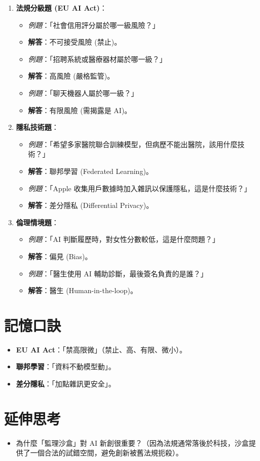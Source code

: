 \documentclass[
  letterpaper,
  DIV=11,
  numbers=noendperiod]{scrreprt}
\providecommand{\tightlist}{%
  \setlength{\itemsep}{0pt}\setlength{\parskip}{0pt}}
\begin{document}
\begin{enumerate}
\def\labelenumi{\arabic{enumi}.}
\tightlist
\item
  \textbf{法規分級題 (EU AI Act)}：

  \begin{itemize}
  \tightlist
  \item
    \emph{例題}：「社會信用評分屬於哪一級風險？」
  \item
    \textbf{解答}：不可接受風險 (禁止)。
  \item
    \emph{例題}：「招聘系統或醫療器材屬於哪一級？」
  \item
    \textbf{解答}：高風險 (嚴格監管)。
  \item
    \emph{例題}：「聊天機器人屬於哪一級？」
  \item
    \textbf{解答}：有限風險 (需揭露是 AI)。
  \end{itemize}
\item
  \textbf{隱私技術題}：

  \begin{itemize}
  \tightlist
  \item
    \emph{例題}：「希望多家醫院聯合訓練模型，但病歷不能出醫院，該用什麼技術？」
  \item
    \textbf{解答}：聯邦學習 (Federated Learning)。
  \item
    \emph{例題}：「Apple
    收集用戶數據時加入雜訊以保護隱私，這是什麼技術？」
  \item
    \textbf{解答}：差分隱私 (Differential Privacy)。
  \end{itemize}
\item
  \textbf{倫理情境題}：

  \begin{itemize}
  \tightlist
  \item
    \emph{例題}：「AI 判斷履歷時，對女性分數較低，這是什麼問題？」
  \item
    \textbf{解答}：偏見 (Bias)。
  \item
    \emph{例題}：「醫生使用 AI 輔助診斷，最後簽名負責的是誰？」
  \item
    \textbf{解答}：醫生 (Human-in-the-loop)。
  \end{itemize}
\end{enumerate}

\section{記憶口訣}\label{ux8a18ux61b6ux53e3ux8a23-10}

\begin{itemize}
\tightlist
\item
  \textbf{EU AI Act}：「禁高限微」（禁止、高、有限、微小）。
\item
  \textbf{聯邦學習}：「資料不動模型動」。
\item
  \textbf{差分隱私}：「加點雜訊更安全」。
\end{itemize}

\section{延伸思考}\label{ux5ef6ux4f38ux601dux8003-10}

\begin{itemize}
\tightlist
\item
  為什麼「監理沙盒」對 AI
  新創很重要？（因為法規通常落後於科技，沙盒提供了一個合法的試錯空間，避免創新被舊法規扼殺）。
\end{itemize}
\end{document}
